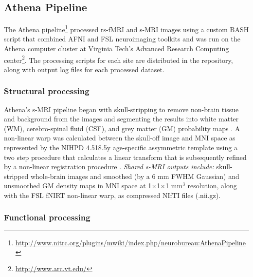 \documentclass[preprint,12pt,3p]{elsarticle}
\begin{document}
\subsection{Athena Pipeline} 
The Athena pipeline\footnote{\url{http://www.nitrc.org/plugins/mwiki/index.php/neurobureau:AthenaPipeline}} processed rs-fMRI and s-MRI images using a custom BASH script that combined AFNI \cite{cox1996afni} and FSL \cite{smith2004advances} neuroimaging toolkits and was run on the Athena computer cluster at Virginia Tech's Advanced Research Computing center\footnote{\url{http://www.arc.vt.edu/}}. The processing scripts for each site are distributed in the repository, along with output log files for each processed dataset.

\subsubsection{Structural processing} Athena's s-MRI pipeline began with skull-stripping to remove non-brain tissue and background from the images \cite{smith2002_bet} and segmenting the results into white matter (WM), cerebro-spinal fluid (CSF), and grey matter (GM) probability maps \cite{zhang2001_fast}. A non-linear warp was calculated between the skull-off image and MNI space as represented by the NIHPD 4.5\textendash18.5y age-specific assymmetric template \cite{fonov2011unbiased} using a two step procedure that calculates a linear transform \cite{jenkinson2002_flirt} that is subsequently refined by a non-linear registration procedure \cite{andersson2007non}. \emph{Shared s-MRI outputs include:} skull-stripped whole-brain images and smoothed (by a 6 mm FWHM Gaussian) and unsmoothed GM density maps in MNI space at 1$\times$1$\times$1 mm$^3$ resolution, along with the FSL fNIRT non-linear warp, as compressed NIfTI files (.nii.gz). 

\subsubsection{Functional processing} 
\end{document}
